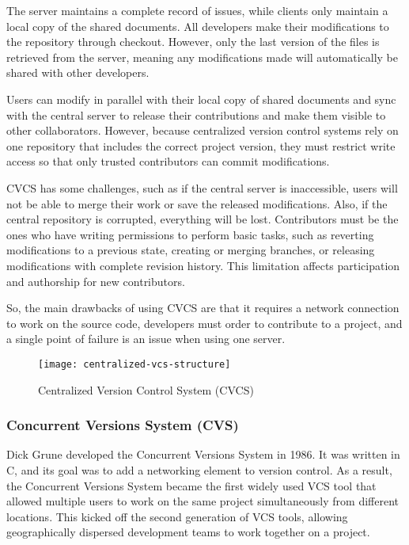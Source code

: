 The server maintains a complete record of issues, while clients only maintain a local copy of the shared documents. All developers make their modifications to the repository through checkout. However, only the last version of the files is retrieved from the server, meaning any modifications made will automatically be shared with other developers.

Users can modify in parallel with their local copy of shared documents and sync with the central server to release their contributions and make them visible to other collaborators. However, because centralized version control systems rely on one repository that includes the correct project version, they must restrict write access so that only trusted contributors can commit modifications.

CVCS has some challenges, such as if the central server is inaccessible, users will not be able to merge their work or save the released modifications. Also, if the central repository is corrupted, everything will be lost. Contributors must be the ones who have writing permissions to perform basic tasks, such as reverting modifications to a previous state, creating or merging branches, or releasing modifications with complete revision history. This limitation affects participation and authorship for new contributors.

So, the main drawbacks of using CVCS are that it requires a network connection to work on the source code, developers must order to contribute to a project, and a single point of failure is an issue when using one server.

\begin{figure}[htbp]
    \centering
    \texttt{[image: centralized-vcs-structure]}
    \caption{Centralized Version Control System (CVCS)}
    \label{fig:cvcs-structure}
\end{figure}

\subsubsection{Concurrent Versions System (CVS)}
Dick Grune developed the Concurrent Versions System in 1986. It was written in C, and its goal was to add a networking element to version control. As a result, the Concurrent Versions System became the first widely used VCS tool that allowed multiple users to work on the same project simultaneously from different locations. This kicked off the second generation of VCS tools, allowing geographically dispersed development teams to work together on a project.

